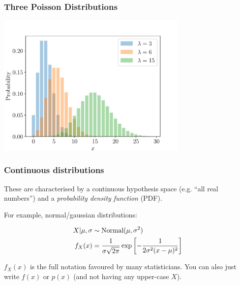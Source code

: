 \documentclass{beamer}
\begin{document}
\begin{frame}[t, fragile]
\frametitle{Three Poisson Distributions}

\begin{center}
  \includegraphics[width=0.7\textwidth]{poisson.pdf}
\end{center}

\end{frame}


\begin{frame}[t, fragile]
\frametitle{Continuous distributions}

These are characterised by a continuous hypothesis space (e.g.
``all real numbers'') and a {\em probability density function} (PDF).
\vspace{1em}

For example, normal/gaussian distributions:

\begin{align}
X | \mu, \sigma &\sim \textnormal{Normal}(\mu, \sigma^2) \\
f_X(x) &= \frac{1}{\sigma \sqrt{2\pi}} \exp\left[-\frac{1}{2\sigma^2(x-\mu)^2}\right]
\end{align}


$f_X(x)$ is the full notation favoured by many statisticians.
You can also just write $f(x)$ or $p(x)$ (and not having any upper-case $X$).

\end{frame}
\end{document}
